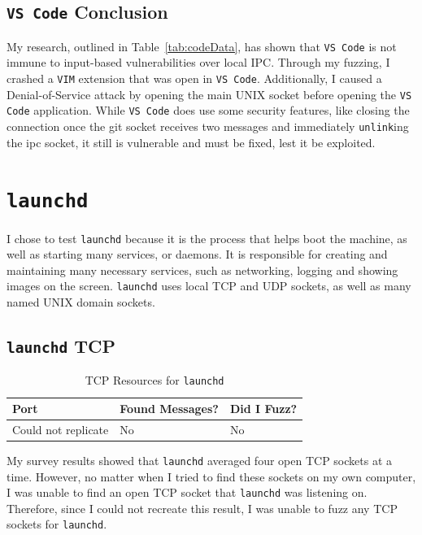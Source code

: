 \subsection{\texttt{VS Code} Conclusion}
\label{sec:codeConclusion}
My research, outlined in Table~\ref{tab:codeData}, has shown that \texttt{VS Code} is not immune to input-based vulnerabilities over local IPC.  Through my fuzzing, I crashed a \texttt{VIM} extension that was open in \texttt{VS Code}.  Additionally, I caused a Denial-of-Service attack by opening the main UNIX socket before opening the \texttt{VS Code} application.  While \texttt{VS Code} does use some security features, like closing the connection once the git socket receives two messages and immediately \texttt{unlink}ing the ipc socket, it still is vulnerable and must be fixed, lest it be exploited.

\section{\texttt{launchd}}
\label{sec:launchd}
I chose to test \texttt{launchd} because it is the process that helps boot the machine, as well as starting many services, or daemons.  It is responsible for creating and maintaining many necessary services, such as networking, logging and showing images on the screen.  \texttt{launchd} uses local TCP and UDP sockets, as well as many named UNIX domain sockets.

\subsection{\texttt{launchd} TCP}
\label{sec:launchdTcp}

\begin{table}
\centering
\begin{normalsize}
\begin{tabular}{ l | l | l }
\textbf{Port} & \textbf{Found Messages?} & \textbf{Did I Fuzz?} \\ \hline
Could not replicate & No & No \\ \hline
\end{tabular}
\caption{TCP Resources for \texttt{launchd}}
\label{tab:launchdTcpTab}
\end{normalsize}
\end{table} 

My survey results showed that \texttt{launchd} averaged four open TCP sockets at a time.  However, no matter when I tried to find these sockets on my own computer, I was unable to find an open TCP socket that \texttt{launchd} was listening on.  Therefore, since I could not recreate this result, I was unable to fuzz any TCP sockets for \texttt{launchd}.

